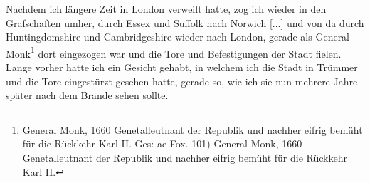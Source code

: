 Nachdem ich längere Zeit in London verweilt hatte, zog ich
wieder in den Grafschaften umher, durch Essex 
und Suffolk nach Norwich [...] und von 
da durch Huntingdomshire und 
Cambridgeshire wieder nach London, 
gerade als General Monk\footnote{General Monk, 1660 
Genetalleutnant der Republik und nachher eifrig
bemüht für die Rückkehr Karl II.
Ges:-ae Fox. 101) General Monk, 1660 Genetalleutnant der 
Republik und nachher eifrig
bemüht für die Rückkehr Karl II.} dort
eingezogen war und die Tore und Befestigungen der Stadt
fielen. Lange vorher hatte ich ein Gesicht gehabt, in welchem
ich die Stadt in Trümmer und die Tore eingestürzt gesehen
hatte, gerade so, wie ich sie nun mehrere Jahre später nach dem
Brande sehen sollte.